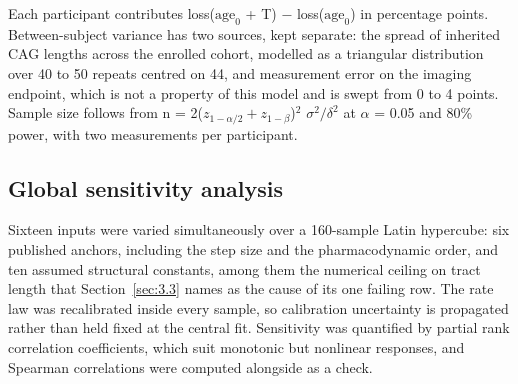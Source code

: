 \documentclass[conference]{IEEEtran}
\begin{document}
Each participant contributes loss($\mathrm{age}_{0}$ + T) $-$ loss($\mathrm{age}_{0}$) in percentage points. Between-subject variance has two sources, kept separate: the spread of inherited CAG lengths across the enrolled cohort, modelled as a triangular distribution over 40 to 50 repeats centred on 44, and measurement error on the imaging endpoint, which is not a property of this model and is swept from 0 to 4 points. Sample size follows from n = 2($z_{1-\alpha/2} + z_{1-\beta}$)$^{2}$ $\sigma^{2}/\delta^{2}$ at $\alpha$ = 0.05 and 80\% power, with two measurements per participant.

\subsection{Global sensitivity analysis}
\label{sec:2.13}
Sixteen inputs were varied simultaneously over a 160-sample Latin hypercube: six published anchors, including the step size and the pharmacodynamic order, and ten assumed structural constants, among them the numerical ceiling on tract length that Section~\ref{sec:3.3} names as the cause of its one failing row. The rate law was recalibrated inside every sample, so calibration uncertainty is propagated rather than held fixed at the central fit. Sensitivity was quantified by partial rank correlation coefficients, which suit monotonic but nonlinear responses, and Spearman correlations were computed alongside as a check.
\end{document}
